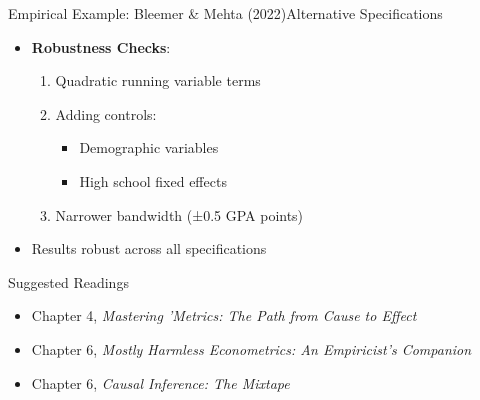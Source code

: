 \documentclass[dvipsnames,hyperref={pdfpagelabels=false}]{beamer}
\begin{document}
\begin{frame}{Empirical Example: Bleemer \& Mehta (2022)}{Alternative Specifications}
	\begin{itemize}
	
		\item \textbf{Robustness Checks}:
		\begin{enumerate}
			\item Quadratic running variable terms
			\item Adding controls:
			\begin{itemize}
				\item Demographic variables
				\item High school fixed effects
			\end{itemize}
			\item Narrower bandwidth (±0.5 GPA points)
		\end{enumerate}
		
		\vspace{0.2cm}
		\item Results robust across all specifications
	\end{itemize}
\end{frame}


\begin{frame}{Suggested Readings} %
	\begin{itemize} 
		\item Chapter 4, \textit{Mastering 'Metrics: The Path from Cause to Effect}
		\vspace{0.2cm}
		\item Chapter 6, \textit{Mostly Harmless Econometrics: An Empiricist's Companion} %
		\vspace{0.2cm}
		\item Chapter 6, \textit{Causal Inference: The Mixtape}
	\end{itemize}
\end{frame}



	
	
	
\end{document}
